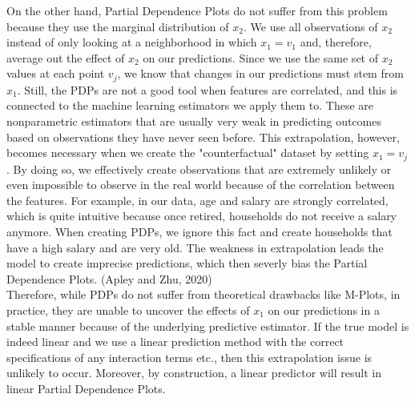 On the other hand, Partial Dependence Plots do not suffer from this problem because they use the marginal distribution of $x_2$. We use all observations of $x_2$ instead of only looking at a neighborhood in which $x_1=v_1$ and, therefore, average out the effect of $x_2$ on our predictions. Since we use the same set of $x_2$ values at each point $v_j$, we know that changes in our predictions must stem from $x_1.$ Still, the PDPs are not a good tool when features are correlated, and this is connected to the machine learning estimators we apply them to. These are nonparametric estimators that are usually very weak in predicting outcomes based on observations they have never seen before. This extrapolation, however, becomes necessary when we create the "counterfactual" dataset by setting $x_1=v_j$. By doing so, we effectively create observations that are extremely unlikely or even impossible to observe in the real world because of the correlation between the features. For example, in our data, age and salary are strongly correlated, which is quite intuitive because once retired, households do not receive a salary anymore. When creating PDPs, we ignore this fact and create households that have a high salary and are very old. The weakness in extrapolation leads the model to create imprecise predictions, which then severly bias the Partial Dependence Plots. (Apley and Zhu, 2020)  \\
Therefore, while PDPs do not suffer from theoretical drawbacks like M-Plots, in practice, they are unable to uncover the effects of $x_1$ on our predictions in a stable manner because of the underlying predictive estimator. If the true model is indeed linear and we use a linear prediction method with the correct specifications of any interaction terms etc., then this extrapolation issue is unlikely to occur. Moreover, by construction, a linear predictor will result in linear Partial Dependence Plots. 

